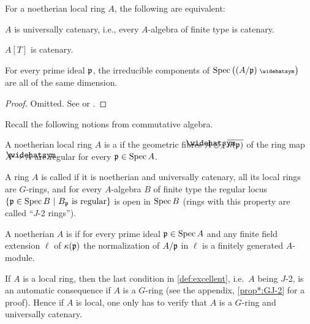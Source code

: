 \documentclass[a4paper, 10pt, oneside, DIV=9, chapterprefix=true, numbers=enddot, bibliography=totoc]{scrbook}
\begin{document}
\begin{thm}[Ratliff]\label{thm:universallyCatenary}
	For a noetherian local ring $A$, the following are equivalent:
	\begin{alphanumerate}
		\item $A$ is universally catenary, i.e., every $A$-algebra of finite type is catenary.
		\item $A[T]$ is catenary.
		\item For every prime ideal $\mathfrak{p}$, the irreducible components of $\Spec \big((A/\pp)^\complete\big)$ are all of the same dimension.
	\end{alphanumerate}
\end{thm}
\begin{proof}
	Omitted. See \cite[Theorem~31.7]{matsumuraCRT} or \cite[]{stacks-project}.
\end{proof}
\begin{defi}\label{def:excellent}
	Recall the following notions from commutative algebra.
	\begin{alphanumerate}
		\item A noetherian local ring $A$ is a  if the geometric fibres $\roof{A}\otimes_A\ov{\kappa(\pp)}$ of the ring map $A\morphism \roof{A}$ are regular for every $\mathfrak{p}\in\operatorname{Spec} A$.
		\item A ring $A$ is called  if it is noetherian and universally catenary, all its local rings are $G$-rings, and for every $A$-algebra $B$ of finite type the regular locus $\left\{\mathfrak{p}\in\operatorname{Spec} B\ \middle|\  B_{\mathfrak{p}}\text{ is regular}\right\}$ is open in $\operatorname{Spec} B$ (rings with this property are called \enquote{$J$-2 rings}).
		\item A noetherian $A$ is  if for every prime ideal $\mathfrak{p}\in\operatorname{Spec} A$ and any finite field extension $\ell$ of $\kappa(\mathfrak{p})$ the normalization of $A/\mathfrak{p}$ in $\ell$ is a finitely generated $A$-module.
	\end{alphanumerate}
\end{defi}
If $A$ is a local ring, then the last condition in \cref{def:excellent}, i.e.\ $A$ being $J$-2, is an automatic consequence if $A$ is a $G$-ring (see the appendix, \cref{prop*:GJ-2} for a proof). Hence if $A$ is local, one only has to verify that $A$ is a $G$-ring and universally catenary.
\end{document}
